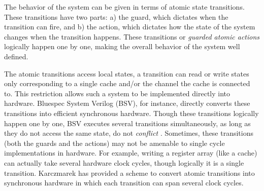 The behavior of the system can be given in terms of atomic state transitions.
These transitions have two parts: a) the guard, which dictates when the
transition can fire, and b) the action, which dictates how the state of the
system changes when the transition happens. These transitions or \emph{guarded
atomic actions} logically happen one by one, making the overall behavior of the
system well defined.

The atomic transitions access local states, \ie a transition can read or write
states only corresponding to a single cache and/or the channel the cache is
connected to. This restriction allows such a system to be implemented directly
into hardware. Bluespec System Verilog (BSV), for instance, directly converts
these transitions into efficient synchronous hardware. Though these transitions
logically happen one by one, BSV executes several transitions simultaneously,
as long as they do not access the same state, \ie do not \emph{conflict}
\cite{Hoe:TCAD,HoeArvind:TRSSynthesis1}. Sometimes, these transitions (both the
guards and the actions) may not be amenable to single cycle implementations in
hardware. For example, writing a register array (like a cache) can actually
take several hardware clock cycles, though logically it is a single transition.
Karczmarek \etal \cite{Karczmarek} has provided a scheme to convert atomic
transitions into synchronous hardware in which each transition can span several
clock cycles.

